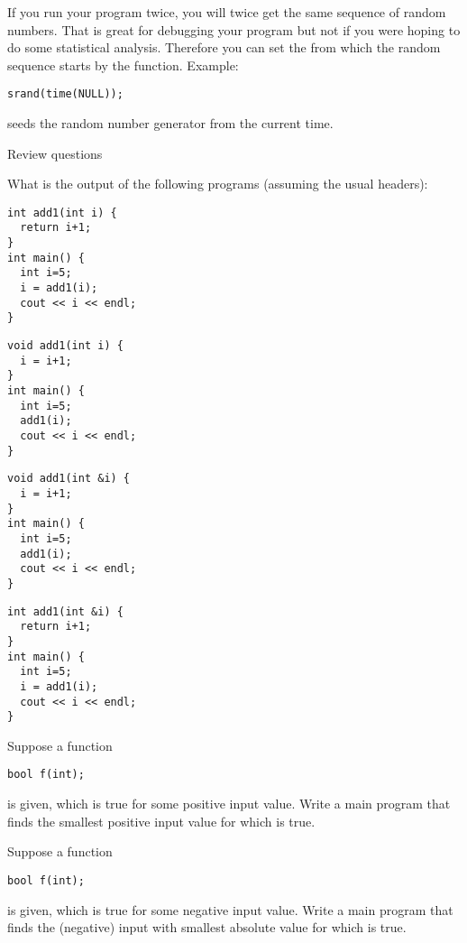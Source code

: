 If you run your program twice, you will twice get the same sequence of
random numbers. That is great for debugging your program but not if
you were hoping to do some statistical analysis. Therefore you can set
the  from which the random sequence
starts by the  function. Example:
\begin{verbatim}
srand(time(NULL));
\end{verbatim}
seeds the random number generator from the current time.

 {Review questions}

\begin{exercise}
  What is the output of the following programs (assuming the usual headers):

  \begin{multicols}{2}
\begin{verbatim}
int add1(int i) {
  return i+1;
}
int main() {
  int i=5;
  i = add1(i);
  cout << i << endl;
}
\end{verbatim}
\columnbreak
\begin{verbatim}
void add1(int i) {
  i = i+1;
}
int main() {
  int i=5;
  add1(i);
  cout << i << endl;
}
\end{verbatim}
  \end{multicols}

  \begin{multicols}{2}
\begin{verbatim}
void add1(int &i) {
  i = i+1;
}
int main() {
  int i=5;
  add1(i);
  cout << i << endl;
}
\end{verbatim}
\columnbreak
\begin{verbatim}
int add1(int &i) {
  return i+1;
}
int main() {
  int i=5;
  i = add1(i);
  cout << i << endl;
}
\end{verbatim}
  \end{multicols}
\end{exercise}

\begin{exercise}
  \label{ex:cpp-funcloop1}
  Suppose a function
\begin{verbatim}
bool f(int);
\end{verbatim}
is given, which is true for some positive input value. Write a main program that
finds the smallest positive input value for which  is true.
\end{exercise}

\begin{exercise}
  \label{ex:cpp-funcloop2}
  Suppose a function
\begin{verbatim}
bool f(int);
\end{verbatim}
is given, which is true for some negative input value. Write a main program that
finds the (negative) input with smallest absolute value for which  is true.
\end{exercise}
